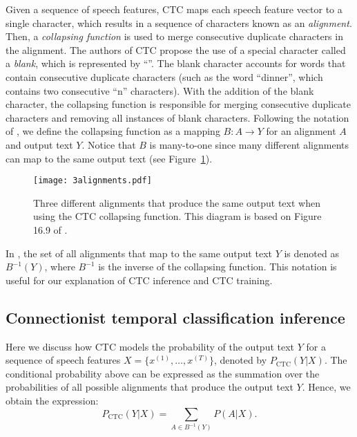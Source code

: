 Given a sequence of speech features, CTC maps each speech feature vector to a single character, which results in a sequence of characters known as an \emph{alignment}. 
Then, a \emph{collapsing function} is used to merge consecutive duplicate characters in the alignment.
The authors of CTC propose the use of a special character called a \emph{blank}, which is represented by ``\textvisiblespace''.
The blank character accounts for words that contain consecutive duplicate characters (such as the word ``dinner'', which contains two consecutive ``n'' characters).
With the addition of the blank character, the collapsing function is responsible for merging consecutive duplicate characters and removing all instances of blank characters.
Following the notation of \cite{jurafskyspeech}, we define the collapsing function as a mapping $B: A \rightarrow Y$ for an alignment $A$ and output text $Y$.
Notice that $B$ is many-to-one since many different alignments can map to the same output text (see Figure~\ref{dinner}).

\begin{figure}[!ht]
    \centering
    
    \texttt{[image: 3alignments.pdf]}
    \caption{Three different alignments that produce the same output text when using the CTC collapsing function. This diagram is based on Figure 16.9 of \cite{jurafskyspeech}.}
    \label{dinner}
\end{figure}

In \cite{jurafskyspeech}, the set of all alignments that map to the same output text $Y$ is denoted as $B^{-1}(Y)$, 
where $B^{-1}$ is the inverse of the collapsing function.
This notation is useful for our explanation of CTC inference and CTC training.

\subsection{Connectionist temporal classification inference}
Here we discuss how CTC models the probability of the output text $Y$ 
for a sequence of speech features $X = \{x^{(1)}, \dots, x^{(T)}\}$, 
denoted by $P_{\text{CTC}}(Y|X)$.
The conditional probability above can be expressed as the summation over the probabilities
of all possible alignments that produce the output text $Y$. 
Hence, we obtain the expression: 
\begin{equation}
    P_{\text{CTC}}(Y|X) = \sum\limits_{A \in B^{-1}(Y)} P(A|X).
\end{equation}


